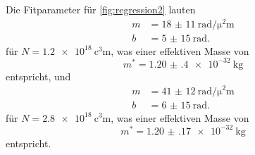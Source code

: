 Die Fitparameter für \autoref{fig:regression2} lauten
\begin{align*}
    m &= \qty{18(11)}{\radian\per\square\micro\meter} \\
    b &= \qty{5(15)}{\radian}.
\end{align*}
für $N = \qty{1.2e18}{\cubic\centi\meter}$, was einer effektiven Masse von
\begin{equation*}
    m^* = \qty{1.20(40)e-32}{\kilo\gram}
\end{equation*}
entspricht, und
\begin{align*}
    m &= \qty{41(12)}{\radian\per\square\micro\meter} \\
    b &= \qty{6(15)}{\radian}.
\end{align*}
für $N = \qty{2.8e18}{\cubic\centi\meter}$, was einer effektiven Masse von
\begin{equation*}
    m^* = \qty{1.20(17)e-32}{\kilo\gram}
\end{equation*} 
entspricht.
